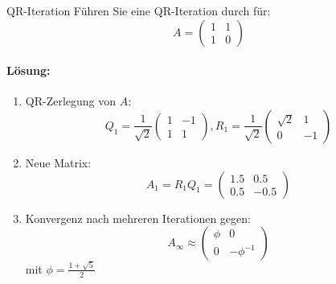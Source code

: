 \begin{example2}{QR-Iteration}
Führen Sie eine QR-Iteration durch für:
$$A = \begin{pmatrix}
1 & 1 \\
1 & 0
\end{pmatrix}$$

\paragraph{Lösung:}
\begin{enumerate}
    \item QR-Zerlegung von $A$:
    $$Q_1 = \frac{1}{\sqrt{2}}\begin{pmatrix}
    1 & -1 \\
    1 & 1
    \end{pmatrix}, 
    R_1 = \frac{1}{\sqrt{2}}\begin{pmatrix}
    \sqrt{2} & 1 \\
    0 & -1
    \end{pmatrix}$$
    
    \item Neue Matrix:
    $$A_1 = R_1Q_1 = \begin{pmatrix}
    1.5 & 0.5 \\
    0.5 & -0.5
    \end{pmatrix}$$
    
    \item Konvergenz nach mehreren Iterationen gegen:
    $$A_\infty \approx \begin{pmatrix}
    \phi & 0 \\
    0 & -\phi^{-1}
    \end{pmatrix}$$
    mit $\phi = \frac{1+\sqrt{5}}{2}$
\end{enumerate}
\end{example2}

